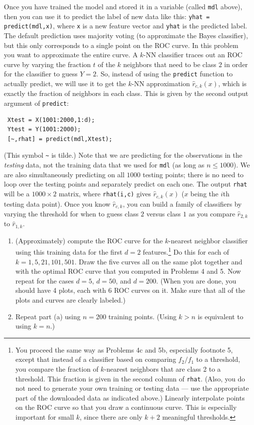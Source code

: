 \documentclass[11pt]{report}
\begin{document}
\begin{enumerate}[1.]
	      Once you have trained the model and stored it in a variable (called {\tt mdl} above), then you can use it to predict the label of new data like this: {\tt yhat = predict(mdl,x)}, where {\tt x} is a new feature vector and {\tt yhat} is the predicted label. The default prediction uses majority voting (to approximate the Bayes classifier), but this only corresponds to a single point on the ROC curve. In this problem you want to approximate the entire curve. A $k$-NN classifier traces out an ROC curve by varying the fraction $t$ of the $k$ neighbors that need to be class $2$ in order for the classifier to guess $Y=2$. So, instead of using the {\tt predict} function to actually predict, we will use it to get the $k$-NN approximation $\hat r_{c,k}(x)$, which is exactly the fraction of neighbors in each class. This is given by the second output argument of {\tt predict}:
	      \begin{verbatim}
 Xtest = X(1001:2000,1:d);
 Ytest = Y(1001:2000);
 [~,rhat] = predict(mdl,Xtest); 
 \end{verbatim}
	      (This symbol \verb|~| is tilde.) Note that we are predicting for the observations in the {\em testing} data, not the training data that we used for {\tt mdl} (as long as $n\leq 1000$). We are also simultaneously predicting on all $1000$ testing points; there is no need to loop over the testing points and separately predict on each one. The output {\tt rhat} will be a $1000\times 2$ matrix, where {\tt rhat(i,c)} gives $\hat r_{c,k}(x)$ ($x$ being the $i$th testing data point). Once you know $\hat r_{c,k}$, you can build a family of classifiers by varying the threshold for when to guess class $2$ versus class $1$ as you compare $\hat r_{2,k}$ to $\hat r_{1,k}$.

	      \begin{enumerate}
		      \item (Approximately) compute the ROC curve for the $k$-nearest neighbor classifier using this training data for the first $d=2$ features.\footnote{You proceed the same way as Problems 4c and 5b, especially footnote 5, except that instead of a classifier based on comparing $f_2/f_1$ to a threshold, you compare the fraction of $k$-nearest neighbors that are class 2 to a threshold.  This fraction is given in the second column of {\tt rhat}. (Also, you do not need to generate your own training or testing data --- use the appropriate part of the downloaded data as indicated above.)  Linearly interpolate points on the ROC curve so that you draw a continuous curve. This is especially important for small $k$, since there are only $k+2$ meaningful thresholds.} Do this for each of $k=1,5,21,101,501$. Draw the five curves all on the same plot together and with the optimal ROC curve that you computed in Problems 4 and 5.  Now repeat for the cases $d=5$, $d=50$, and $d=200$. (When you are done, you should have 4 plots, each with 6 ROC curves on it. Make sure that all of the plots and curves are clearly labeled.)
		      \item Repeat part (a) using $n=200$ training points. (Using $k > n$ is equivalent to using $k=n$.)


\end{enumerate}
\end{enumerate}
\end{document}
